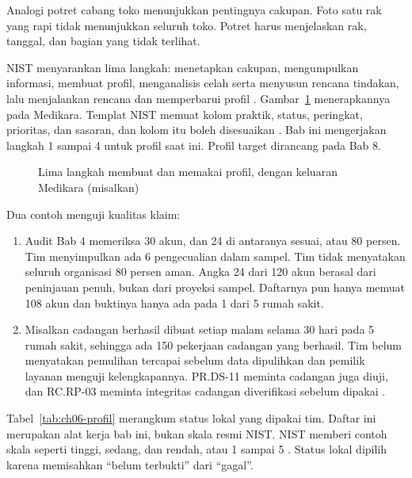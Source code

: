 Analogi potret cabang toko menunjukkan pentingnya cakupan. Foto satu rak yang rapi tidak menunjukkan
seluruh toko. Potret harus menjelaskan rak, tanggal, dan bagian yang tidak terlihat.

NIST menyarankan lima langkah: menetapkan cakupan, mengumpulkan informasi, membuat profil,
menganalisis celah serta menyusun rencana tindakan, lalu menjalankan rencana dan memperbarui profil
\cite{nistcsf2,c06-nist-sp1301}. Gambar~\ref{fig:ch06-langkah-profil} menerapkannya pada Medikara.
Templat NIST memuat kolom praktik, status, peringkat, prioritas, dan sasaran, dan kolom itu boleh
disesuaikan \cite{c06-nist-sp1301}. Bab ini mengerjakan langkah 1 sampai 4 untuk profil saat ini.
Profil target dirancang pada Bab 8.

\begin{figure}[!htb]
  \centering
  
  \caption{Lima langkah membuat dan memakai profil, dengan keluaran Medikara (misalkan)}
  \label{fig:ch06-langkah-profil}
\end{figure}

Dua contoh menguji kualitas klaim:
\begin{enumerate}
  \item Audit Bab 4 memeriksa 30 akun, dan 24 di antaranya sesuai, atau 80 persen. Tim menyimpulkan
  ada 6 pengecualian dalam sampel. Tim tidak menyatakan seluruh organisasi 80 persen aman. Angka 24
  dari 120 akun berasal dari peninjauan penuh, bukan dari proyeksi sampel. Daftarnya pun hanya memuat
  108 akun dan buktinya hanya ada pada 1 dari 5 rumah sakit.
  \item Misalkan cadangan berhasil dibuat setiap malam selama 30 hari pada 5 rumah sakit, sehingga
  ada 150 pekerjaan cadangan yang berhasil. Tim belum menyatakan pemulihan tercapai sebelum data
  dipulihkan dan pemilik layanan menguji kelengkapannya. PR.DS-11 meminta cadangan juga diuji, dan
  RC.RP-03 meminta integritas cadangan diverifikasi sebelum dipakai \cite{nistcsf2}.
\end{enumerate}

Tabel~\ref{tab:ch06-profil} merangkum status lokal yang dipakai tim. Daftar ini merupakan alat kerja
bab ini, bukan skala resmi NIST. NIST memberi contoh skala seperti tinggi, sedang, dan rendah, atau
1 sampai 5 \cite{c06-nist-sp1301}. Status lokal dipilih karena memisahkan ``belum terbukti'' dari
``gagal''.

